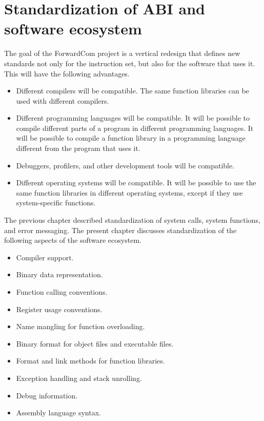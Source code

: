 \documentclass[forwardcom.tex]{subfiles}
\begin{document}
\RaggedRight

\chapter{Standardization of ABI and software ecosystem} \label{StandardizationOfAbi}
The goal of the ForwardCom project is a vertical redesign that defines new standards not only for the instruction set, but also for the software that uses it. This will have the following advantages.

\begin{itemize}
\item Different compilers will be compatible. The same function libraries can be used with different compilers. 

\item Different programming languages will be compatible. It will be possible to compile different parts of a program in different programming languages. It will be possible to compile a function library in a programming language different from the program that uses it. 

\item Debuggers, profilers, and other development tools will be compatible. 

\item Different operating systems will be compatible. It will be possible to use the same function libraries in different operating systems, except if they use system-specific functions. 
\end{itemize}

The previous chapter described standardization of system calls, system functions, and error messaging. The present chapter discusses standardization of the following aspects of the software ecosystem. 

\begin{itemize}
\item Compiler support. 

\item Binary data representation. 

\item Function calling conventions. 

\item Register usage conventions.

\item Name mangling for function overloading.

\item Binary format for object files and executable files.

\item Format and link methods for function libraries.

\item Exception handling and stack unrolling.

\item Debug information.

\item Assembly language syntax. 

\end{itemize}
\end{document}
